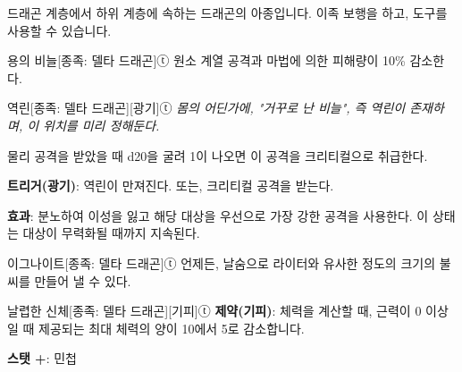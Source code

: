 \documentclass{report}
\begin{document}
	드래곤 계층에서 하위 계층에 속하는 드래곤의 아종입니다. 이족 보행을 하고, 도구를 사용할 수 있습니다.
	
	\begin{story}{용의 비늘}{[종족: 델타 드래곤]ⓣ}
		원소 계열 공격과 마법에 의한 피해량이 10\% 감소한다.
		
	\end{story}
	
	\begin{story}{역린}{[종족: 델타 드래곤][광기]ⓣ}
		\textit{몸의 어딘가에, "거꾸로 난 비늘", 즉 \emph{역린}이 존재하며, 이 위치를 미리 정해둔다.}
		
		물리 공격을 받았을 때 d20을 굴려 1이 나오면 이 공격을 크리티컬으로 취급한다.
		
		\textbf{트리거(광기)}: 역린이 만져진다. 또는, 크리티컬 공격을 받는다.
		
		\textbf{효과}: 분노하여 이성을 잃고 해당 대상을 우선으로 가장 강한 공격을 사용한다. 이 상태는 대상이 무력화될 때까지 지속된다.
		
	\end{story}
	
	\begin{story}{이그나이트}{[종족: 델타 드래곤]ⓣ}
		언제든, 날숨으로 라이터와 유사한 정도의 크기의 불씨를 만들어 낼 수 있다.
		
	\end{story}
	
	\begin{story}{날렵한 신체}{[종족: 델타 드래곤][기피]ⓣ}
		\textbf{제약(기피)}: 체력을 계산할 때, 근력이 0 이상일 때 제공되는 최대 체력의 양이 10에서 5로 감소합니다.
		
		\textbf{스탯 +}: 민첩
		
	\end{story}
\end{document}
